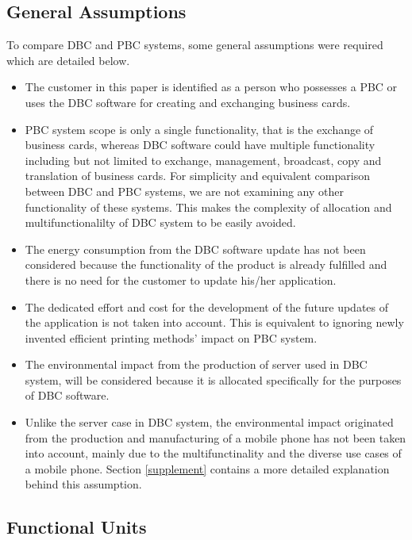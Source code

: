 \documentclass[conference]{IEEEtran}
\begin{document}
\subsection{General Assumptions}
To compare DBC and PBC systems, some general assumptions were required which are detailed below.

\begin{itemize}
\item The customer in this paper is identified as a person who possesses a PBC or uses the DBC software for creating and exchanging business cards.
\item PBC system scope is only a single functionality, that is the exchange of business cards, whereas DBC software could have multiple functionality  including but not limited to exchange, management, broadcast, copy and translation of business cards. For simplicity and equivalent comparison between DBC and PBC systems, we are not examining any other functionality of these systems. This makes the complexity of allocation and multifunctionalilty of DBC system to be easily avoided.
\item The energy consumption from the DBC software update has not been considered because the functionality of the product is already fulfilled and there is no need for the customer to update his/her application.
\item The dedicated effort and cost for the development of the future updates of the application is not taken into account. This is equivalent to ignoring newly invented efficient printing methods' impact on PBC system.
\item The environmental impact from the production of server used in DBC system, will be considered because it is allocated specifically for the purposes of DBC software.
\item Unlike the server case in DBC system, the environmental impact originated from the production and manufacturing of a mobile phone has not been taken into account, mainly due to the multifunctinality and the diverse use cases of a mobile phone. Section \ref{supplement} contains a more detailed explanation behind this assumption.
\end{itemize}

\subsection{Functional Units}\label{sec:FunctionalUnit}
\end{document}
